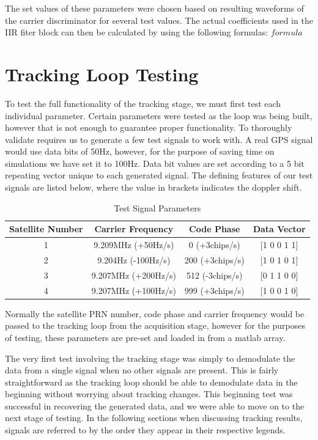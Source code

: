 \documentclass[11pt]{article}
\numberwithin{equation}{subsection}
\begin{document}
	The set values of these parameters were chosen based on resulting waveforms of the carrier discriminator for several test values. 
	The actual coefficients used in the IIR fiter block can then be calculated by using the following formulas:
	$ formula $
	
	
	\section{Tracking Loop Testing}
	
	To test the full functionality of the tracking stage, we must first test each individual parameter. Certain parameters were tested as the loop was being built, however that is not enough to guarantee proper functionality. To thoroughly validate requires us to generate a few test signals to work with. A real GPS signal would use data bits of 50Hz, however, for the purpose of saving time on simulations we have set it to 100Hz. Data bit values are set according to a 5 bit repeating vector unique to each generated signal. The defining features of our test signals are listed below, where the value in brackets indicates the doppler shift.
	
	
	\begin{table}
		\begin{center}
			\begin{tabular}{||c c c c||}
				\hline
				Satellite Number & Carrier Frequency & Code Phase &Data Vector	\\
				\hline\hline
				1 & 9.209MHz (+50Hz/s) & 0 (+3chips/s) & [1 0 0 1 1] \\
				\hline
				2 & 9.204Hz (-100Hz/s) & 200 (+3chips/s) & [1 0 1 0 1]\\
				\hline
				3 & 9.207MHz (+200Hz/s) & 512 (-3chips/s) & [0 1 1 0 0]\\
				\hline
				4 & 9.207MHz (+100Hz/s) & 999 (+3chips/s) & [1 0 0 1 0]\\
				\hline
			\end{tabular}
			\caption{Test Signal Parameters}
			\label{tsp}
		\end{center}
	\end{table}
	
	Normally the satellite PRN number, code phase and carrier frequency would be passed to the tracking loop from the acquisition stage, however for the purposes of testing, these parameters are pre-set and loaded in from a matlab array.
	
	The very first test involving the tracking stage was simply to demodulate the data from a single signal when no other signals are present. This is fairly straightforward as the tracking loop should be able to demodulate data in the beginning without worrying about tracking changes. This beginning test was successful in recovering the generated data, and we were able to move on to the next stage of testing. 
	In the following sections when discussing tracking results, signals are referred to by the order they appear in their respective legends.
	
\end{document}

